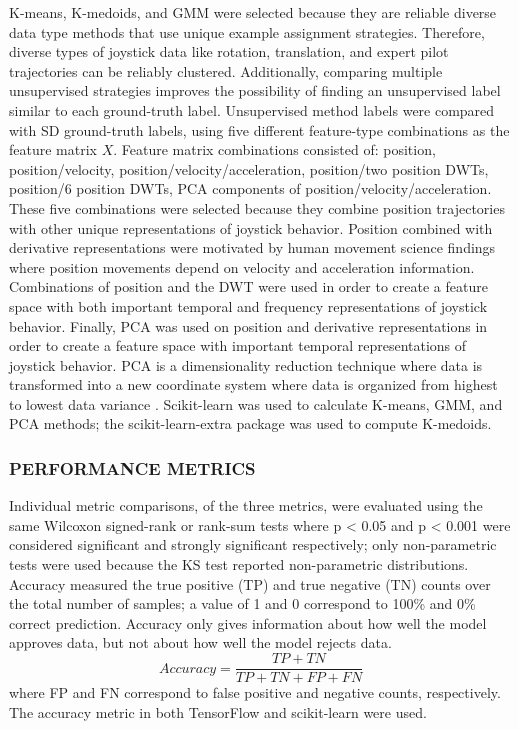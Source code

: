 \documentclass{ieeeaccess}
\begin{document}
K-means, K-medoids, and GMM were selected because they are reliable diverse data type methods that use unique example assignment strategies. Therefore, diverse types of joystick data like rotation, translation, and expert pilot trajectories can be reliably clustered. Additionally, comparing multiple unsupervised strategies improves the possibility of finding an unsupervised label similar to each ground-truth label. Unsupervised method labels were compared with SD ground-truth labels, using five different feature-type combinations as the feature matrix $X$. Feature matrix combinations consisted of: position, position/velocity, position/velocity/acceleration, position/two position DWTs, position/6 position DWTs, PCA components of position/velocity/acceleration. These five combinations were selected because they combine position trajectories with other unique representations of joystick behavior. Position combined with derivative representations were motivated by human movement science findings where position movements depend on velocity and acceleration information. Combinations of position and the DWT were used in order to create a feature space with both important temporal and frequency representations of joystick behavior. Finally, PCA was used on position and derivative representations in order to create a feature space with important temporal representations of joystick behavior. PCA is a dimensionality reduction technique where data is transformed into a new coordinate system where data is organized from highest to lowest data variance \cite{Burkov_2019_ML}. Scikit-learn was used to calculate K-means, GMM, and PCA methods; the scikit-learn-extra package was used to compute K-medoids.


\subsubsection{PERFORMANCE METRICS}
\label{PERFORMANCE_METRICS}
Individual metric comparisons, of the three metrics, were evaluated using the same Wilcoxon signed-rank or rank-sum tests where p < 0.05 and p < 0.001 were considered significant and strongly significant respectively; only non-parametric tests were used because the KS test reported non-parametric distributions. Accuracy measured the true positive (TP) and true negative (TN) counts over the total number of samples; a value of 1 and 0 correspond to 100\% and 0\% correct prediction. Accuracy only gives information about how well the model approves data, but not about how well the model rejects data.
\begin{equation}
Accuracy = \frac{TP+TN}{TP+TN+FP+FN}
\label{eqn_accuracy}
\end{equation}
where FP and FN correspond to false positive and negative counts, respectively. The accuracy metric in both TensorFlow and scikit-learn were used.
\end{document}
